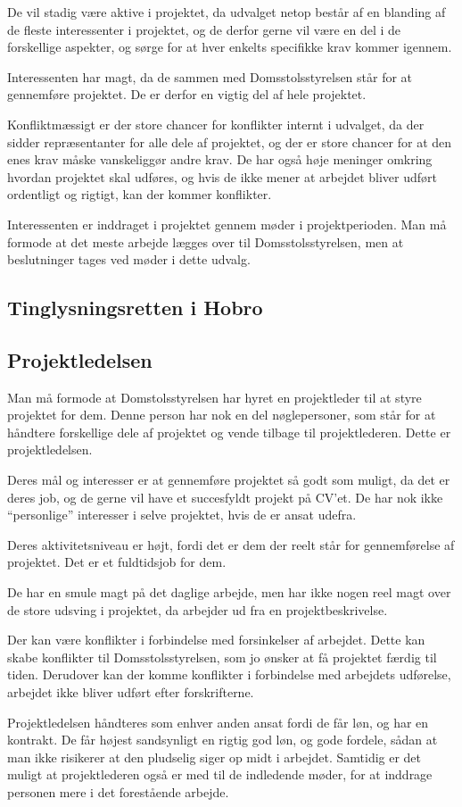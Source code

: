 \documentclass[10pt,a4paper,danish]{article}
\begin{document}
De vil stadig være aktive i projektet, da udvalget netop består af en blanding af de fleste interessenter i projektet, og de derfor gerne vil være en del i de forskellige aspekter, og sørge for at hver enkelts specifikke krav kommer igennem.

Interessenten har magt, da de sammen med Domsstolsstyrelsen står for at gennemføre projektet. De er derfor en vigtig del af hele projektet.

Konfliktmæssigt er der store chancer for konflikter internt i udvalget, da der sidder repræsentanter for alle dele af projektet, og der er store chancer for at den enes krav måske vanskeliggør andre krav. De har også høje meninger omkring hvordan projektet skal udføres, og hvis de ikke mener at arbejdet bliver udført ordentligt og rigtigt, kan der kommer konflikter.

Interessenten er inddraget i projektet gennem møder i projektperioden. Man må formode at det meste arbejde lægges over til Domsstolsstyrelsen, men at beslutninger tages ved møder i dette udvalg.

\subsection{Tinglysningsretten i Hobro}


\subsection{Projektledelsen}
Man må formode at Domstolsstyrelsen har hyret en projektleder til at styre projektet for dem. Denne person har nok en del nøglepersoner, som står for at håndtere forskellige dele af projektet og vende tilbage til projektlederen. Dette er projektledelsen.

Deres mål og interesser er at gennemføre projektet så godt som muligt, da det er deres job, og de gerne vil have et succesfyldt projekt på CV'et. De har nok ikke "`personlige"' interesser i selve projektet, hvis de er ansat udefra.

Deres aktivitetsniveau er højt, fordi det er dem der reelt står for gennemførelse af projektet. Det er et fuldtidsjob for dem.

De har en smule magt på det daglige arbejde, men har ikke nogen reel magt over de store udsving i projektet, da arbejder ud fra en projektbeskrivelse.

Der kan være konflikter i forbindelse med forsinkelser af arbejdet. Dette kan skabe konflikter til Domsstolsstyrelsen, som jo ønsker at få projektet færdig til tiden. Derudover kan der komme konflikter i forbindelse med arbejdets udførelse, arbejdet ikke bliver udført efter forskrifterne.

Projektledelsen håndteres som enhver anden ansat fordi de får løn, og har en kontrakt. De får højest sandsynligt en rigtig god løn, og gode fordele, sådan at man ikke risikerer at den pludselig siger op midt i arbejdet. Samtidig er det muligt at projektlederen også er med til de indledende møder, for at inddrage personen mere i det forestående arbejde.
\end{document}
